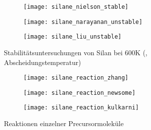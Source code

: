 \begin{figure}[h]

  \captionsetup[subfigure]{singlelinecheck=false}
  \def\subfigwidth{0.32\textwidth}
  \begin{subfigure}[t]{3.5cm}
    \texttt{[image: silane\_nielson\_stable]}
  \end{subfigure}
  \hfill
  \begin{subfigure}[t]{4.5cm}
    \texttt{[image: silane\_narayanan\_unstable]}
  \end{subfigure}
  \hfill
  \begin{subfigure}[t]{5cm}
    \texttt{[image: silane\_liu\_unstable]}
  \end{subfigure}

  \caption[Stabilität von Silan]{Stabilitätsuntersuchungen von Silan bei 600K (, Abscheidungstemperatur)}
  \label{fig:silanestability}

\end{figure}

\begin{figure}[h]

  \captionsetup[subfigure]{singlelinecheck=false}
  \def\subfigwidth{0.32\textwidth}
  \begin{subfigure}[t]{3cm}
    \texttt{[image: silane\_reaction\_zhang]}
  \end{subfigure}
  \hfill
  \begin{subfigure}[t]{5cm}
    \texttt{[image: silane\_reaction\_newsome]}
  \end{subfigure}
  \hfill
  \begin{subfigure}[t]{4.5cm}
    \texttt{[image: silane\_reaction\_kulkarni]}
  \end{subfigure}


  \caption[Reaktionen von Precursormolekülen]{Reaktionen einzelner Precursormoleküle}
  \label{fig:precursorreactions}

\end{figure}

